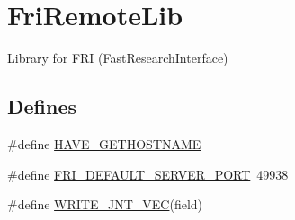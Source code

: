 \hypertarget{group__friRemoteLib}{\section{\-Fri\-Remote\-Lib}
\label{group__friRemoteLib}
}


\-Library for \-F\-R\-I (\-Fast\-Research\-Interface)  


\subsection*{\-Defines}
\begin{DoxyCompactItemize}
\item 
\#define \hyperlink{group__friRemoteLib_gac0b94ec7b234d12081fda3f601aa01b5}{\-H\-A\-V\-E\-\_\-\-G\-E\-T\-H\-O\-S\-T\-N\-A\-M\-E}
\item 
\#define \hyperlink{group__friRemoteLib_ga0060efa69492840494ae541296595f88}{\-F\-R\-I\-\_\-\-D\-E\-F\-A\-U\-L\-T\-\_\-\-S\-E\-R\-V\-E\-R\-\_\-\-P\-O\-R\-T}~49938
\item 
\#define \hyperlink{group__friRemoteLib_ga898946f34c9f0aa3c294d050b8b6d4dc}{\-W\-R\-I\-T\-E\-\_\-\-J\-N\-T\-\_\-\-V\-E\-C}(field)
\end{DoxyCompactItemize}
